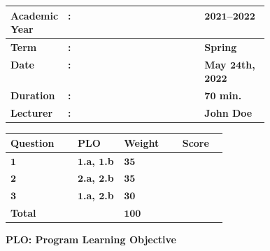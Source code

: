 \documentclass[a4paper, 11pt]{article}
\begin{document}
	\begin{table}[!ht]
		\renewcommand{\arraystretch}{1.1}
		\centering
		\begin{tabular}{@{}>{\bfseries}L{0.18\linewidth}>{\bfseries}C{0.00\linewidth}>{\bfseries}L{0.25\linewidth}@{}}
			\toprule
			Academic Year  & : & $\bm{2021}$--$\bm{2022}$                  \\ 
			\midrule
			Term         & : & \textbf{Spring}                             \\ 
			\midrule
			Date         & : & May $\bm{24}$th, $\bm{2022}$                           \\ 
			\midrule
			Duration          & : & $\bm{70}$ \textbf{min.}                \\
			\midrule
			Lecturer & : & \textbf{John Doe} \\
			\bottomrule
		\end{tabular}
		\hfill
		\renewcommand{\arraystretch}{1.1}
		\begin{tabular}{>{\bfseries}C{0.1\linewidth}>{\bfseries}C{0.1\linewidth}>{\bfseries}C{0.1\linewidth}>{\bfseries}C{0.06\linewidth}}
			Question & PLO      & Weight & Score \\
			\toprule
			$\bm{1}$ & $\bm{1}$.a, $\bm{1}$.b & $\bm{35}$    & ~   \\
			\midrule
			$\bm{2}$ & $\bm{2}$.a, $\bm{2}$.b & $\bm{35}$    & ~   \\
			\midrule
			$\bm{3}$ & $\bm{1}$.a, $\bm{2}$.b & $\bm{30}$    & ~   \\
			\midrule
			Total    & ~              		  & $\bm{100}$   & ~   \\
			\bottomrule
		\end{tabular}
		\vspace{-0.3cm}
		\begin{flushright}
			\textbf{PLO: Program Learning Objective}
		\end{flushright}
	\end{table}
	\vspace{-1cm}
	
\end{document}
